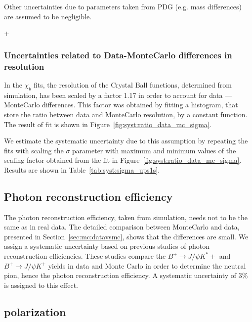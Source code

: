  Other uncertainties due to parameters taken from PDG (e.g. mass differences)
 are assumed to be negligible.
 
+\subsubsection{Uncertainties related to Data-MonteCarlo differences in resolution}
 
In the $\chi_b$ fits, the resolution of the Crystal Ball functions, determined
from simulation, has been scaled by a factor 1.17 in order to account for data
--- MonteCarlo differences. This factor was obtained by fitting a histogram,
that store the ratio between data and MonteCarlo resolution, by a constant
function. The result of fit is shown in
Figure~\ref{fig:syst:ratio_data_mc_sigma}.
 
% 


We estimate the systematic uncertainty due to this assumption by repeating the
fits with scaling the $\sigma$ parameter with maximum and minimum values of
the scaling factor obtained from the fit in Figure~\ref{fig:syst:ratio_data_mc_sigma}.
Results are shown in Table~\ref{tab:syst:sigma_ups1s}.



\subsection{Photon reconstruction efficiency}
The photon reconstruction efficiency, taken from simulation, needs not to be
the same as in real data. The detailed comparison between MonteCarlo and data,
presented in Section~\ref{sec:mc:datavsmc}, shows that the differences
are small. We assign a systematic uncertainty based on previous studies of
photon reconstruction efficiencies. These studies compare the $B^+ \rightarrow
J/\psi K^*+$ and $B^+ \rightarrow J/\psi K^+$ yields in data and Monte Carlo in
order to determine the neutral pion, hence the photon  reconstruction
efficiency. A systematic uncertainty of 3\% is assigned to this effect.






\subsection{\texorpdfstring{\chib}{chib} polarization}
\label{sec:syst:pol}

